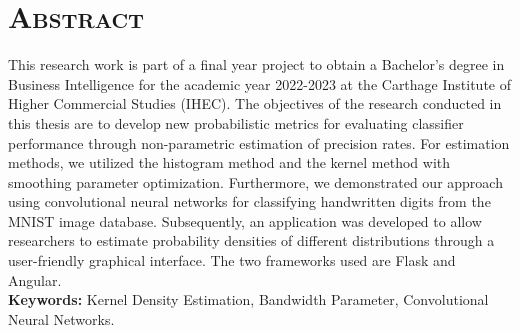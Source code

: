 \documentclass[a4paper, 12pt]{report}
\begin{document}
\section*{\textsc{Abstract}}
This research work is part of a final year project to obtain a Bachelor's degree in Business Intelligence for the academic year 2022-2023 at the Carthage Institute of Higher Commercial Studies (IHEC). The objectives of the research conducted in this thesis are to develop new probabilistic metrics for evaluating classifier performance through non-parametric estimation of precision rates. For estimation methods, we utilized the histogram method and the kernel method with smoothing parameter optimization. Furthermore, we demonstrated our approach using convolutional neural networks for classifying handwritten digits from the MNIST image database. Subsequently, an application was developed to allow researchers to estimate probability densities of different distributions through a user-friendly graphical interface. The two frameworks used are Flask and Angular.\\
\textbf{Keywords:} 
Kernel Density Estimation, Bandwidth Parameter, Convolutional Neural Networks.
\end{document}
